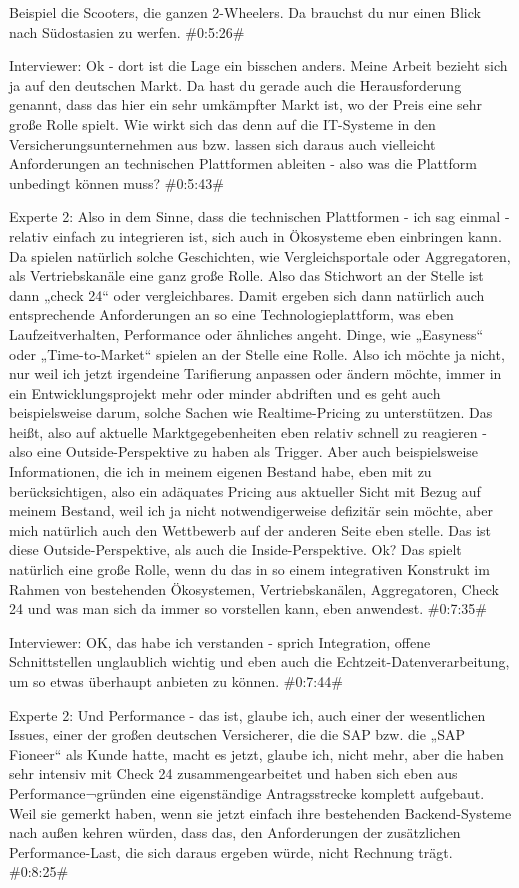 Beispiel die Scooters, die ganzen 2-Wheelers. Da brauchst du nur einen Blick nach Südostasien zu werfen.
\#0:5:26\#

Interviewer:
Ok - dort ist die Lage ein bisschen anders. Meine Arbeit bezieht sich ja auf den deutschen Markt. Da hast du gerade auch die Herausforderung genannt, dass das hier ein sehr umkämpfter Markt ist, wo der Preis eine sehr große Rolle spielt. Wie wirkt sich das denn auf die IT-Systeme in den Versicherungsunternehmen aus bzw. lassen sich daraus auch vielleicht Anforderungen an technischen Plattformen ableiten - also was die Plattform unbedingt können muss?
\#0:5:43\#

Experte 2:
Also in dem Sinne, dass die technischen Plattformen - ich sag einmal - relativ einfach zu integrieren ist, sich auch in Ökosysteme eben einbringen kann. Da spielen natürlich solche Geschichten, wie Vergleichsportale oder Aggregatoren, als Vertriebskanäle eine ganz große Rolle. Also das Stichwort an der Stelle ist dann „check 24“ oder vergleichbares. Damit ergeben sich dann natürlich auch entsprechende Anforderungen an so eine Technologieplattform, was eben Laufzeitverhalten, Performance oder ähnliches angeht. Dinge, wie „Easyness“ oder „Time-to-Market“ spielen an der Stelle eine Rolle. Also ich möchte ja nicht, nur weil ich jetzt irgendeine Tarifierung anpassen oder ändern möchte, immer in ein Entwicklungsprojekt mehr oder minder abdriften und es geht auch beispielsweise darum, solche Sachen wie Realtime-Pricing zu unterstützen. Das heißt, also auf aktuelle Marktgegebenheiten eben relativ schnell zu reagieren - also eine Outside-Perspektive zu haben als Trigger. Aber auch beispielsweise Informationen, die ich in meinem eigenen Bestand habe, eben mit zu berücksichtigen, also ein adäquates Pricing aus aktueller Sicht mit Bezug auf meinem Bestand, weil ich ja nicht notwendigerweise defizitär sein möchte, aber mich natürlich auch den Wettbewerb auf der anderen Seite eben stelle. Das ist diese Outside-Perspektive, als auch die Inside-Perspektive. Ok? Das spielt natürlich eine große Rolle, wenn du das in so einem integrativen Konstrukt im Rahmen von bestehenden Ökosystemen, Vertriebskanälen, Aggregatoren, Check 24 und was man sich da immer so vorstellen kann, eben anwendest.
\#0:7:35\#

Interviewer:
OK, das habe ich verstanden - sprich Integration, offene Schnittstellen unglaublich wichtig und eben auch die Echtzeit-Datenverarbeitung, um so etwas überhaupt anbieten zu können.
\#0:7:44\#

Experte 2:
Und Performance - das ist, glaube ich, auch einer der wesentlichen Issues, einer der großen deutschen Versicherer, die die SAP bzw. die „SAP Fioneer“ als Kunde hatte, macht es jetzt, glaube ich, nicht mehr, aber die haben sehr intensiv mit Check 24 zusammengearbeitet und haben sich eben aus Performance¬gründen eine eigenständige Antragsstrecke komplett aufgebaut. Weil sie gemerkt haben, wenn sie jetzt einfach ihre bestehenden Backend-Systeme nach außen kehren würden, dass das, den Anforderungen der zusätzlichen Performance-Last, die sich daraus ergeben würde, nicht Rechnung trägt.
\#0:8:25\#

